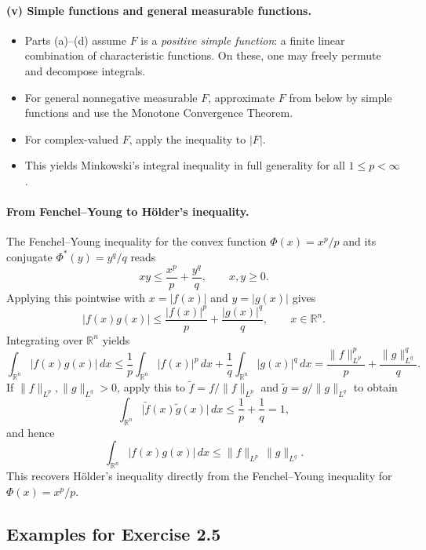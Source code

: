 \documentclass[12pt,a4paper]{article}
\theoremstyle{plain}
\theoremstyle{definition}
\theoremstyle{remark}
\theoremstyle{remark}
\begin{document}
\bigskip

\paragraph*{(v) Simple functions and general measurable functions.}

\begin{itemize}
	\item Parts (a)--(d) assume $F$ is a \emph{positive simple function}:
	a finite linear combination of characteristic functions.
	On these, one may freely permute and decompose integrals.
	
	\item For general nonnegative measurable $F$, approximate $F$ from below
	by simple functions and use the Monotone Convergence Theorem.
	
	\item For complex-valued $F$, apply the inequality to $|F|$.
	
	\item This yields Minkowski's integral inequality in full generality
	for all $1 \le p < \infty$.
\end{itemize}


\paragraph*{From Fenchel--Young to Hölder's inequality.}

The Fenchel--Young inequality for the convex function
$\Phi(x)=x^p/p$ and its conjugate $\Phi^*(y)=y^q/q$ reads
\[
xy \le \frac{x^p}{p} + \frac{y^q}{q},
\qquad x,y\ge 0.
\]
Applying this pointwise with $x=|f(x)|$ and $y=|g(x)|$ gives
\[
|f(x)g(x)|
\le \frac{|f(x)|^p}{p} + \frac{|g(x)|^q}{q},
\qquad x\in\mathbb{R}^n.
\]
Integrating over $\mathbb{R}^n$ yields
\[
\int_{\mathbb{R}^n} |f(x)g(x)|\,dx
\le \frac1p \int_{\mathbb{R}^n} |f(x)|^p\,dx
+ \frac1q \int_{\mathbb{R}^n} |g(x)|^q\,dx
= \frac{\|f\|_{L^p}^p}{p} + \frac{\|g\|_{L^q}^q}{q}.
\]
If $\|f\|_{L^p},\|g\|_{L^q}>0$, apply this to
$\tilde f = f/\|f\|_{L^p}$ and $\tilde g = g/\|g\|_{L^q}$ to obtain
\[
\int_{\mathbb{R}^n}
\bigl|\tilde f(x)\tilde g(x)\bigr|\,dx
\le \frac1p + \frac1q = 1,
\]
and hence
\[
\int_{\mathbb{R}^n} |f(x)g(x)|\,dx
\le \|f\|_{L^p}\,\|g\|_{L^q}.
\]
This recovers Hölder's inequality directly from the
Fenchel--Young inequality for $\Phi(x)=x^p/p$.


\subsection*{Examples for Exercise 2.5}
\end{document}
